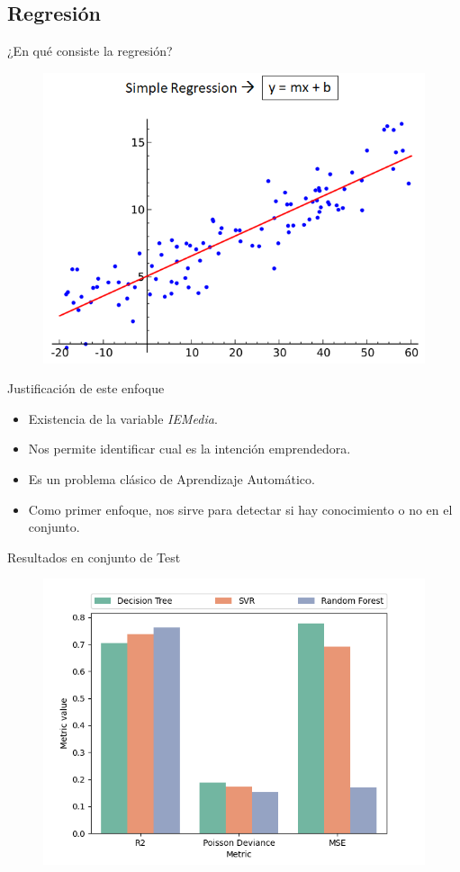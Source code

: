 \documentclass{beamer}
\begin{document}
	\subsection{Regresión}
		\begin{frame}{¿En qué consiste la regresión?}
 			\begin{figure}
				\centering
				\includegraphics[scale=0.4]{regresion }
			\end{figure}
		\end{frame}
		\begin{frame}{Justificación de este enfoque}
			\begin{itemize}
				\item Existencia de la variable \textit{IEMedia}.
				\item Nos permite identificar cual es la intención emprendedora.
				\item Es un problema clásico de Aprendizaje Automático.
				\item Como primer enfoque, nos sirve para detectar si hay conocimiento o no en el conjunto.
			\end{itemize}
		\end{frame}
		\begin{frame}{Resultados en conjunto de Test}
			\begin{figure}
				\centering
				\includegraphics[scale=0.5]{reg_test_metrics}
			\end{figure}
		\end{frame}
\end{document}
